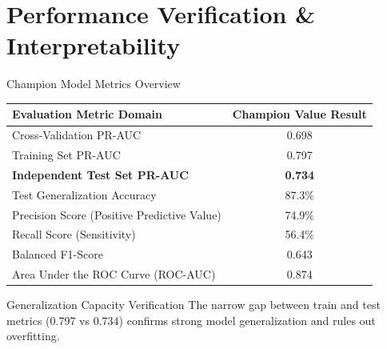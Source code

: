 \section{Performance Verification \& Interpretability}

\begin{frame}{Champion Model Metrics Overview}
\centering
\small
\begin{tabular}{lc}
\toprule
\textbf{Evaluation Metric Domain} & \textbf{Champion Value Result} \\
\midrule
Cross-Validation PR-AUC & 0.698 \\
Training Set PR-AUC & 0.797 \\
\textbf{Independent Test Set PR-AUC} & \textbf{0.734} \\
Test Generalization Accuracy & 87.3\% \\
Precision Score (Positive Predictive Value) & 74.9\% \\
Recall Score (Sensitivity) & 56.4\% \\
Balanced F1-Score & 0.643 \\
Area Under the ROC Curve (ROC-AUC) & 0.874 \\
\bottomrule
\end{tabular}
\vspace{0.25cm}
\begin{block}{Generalization Capacity Verification}
The narrow gap between train and test metrics (0.797 vs 0.734) confirms strong model generalization and rules out overfitting.
\end{block}
\end{frame}

